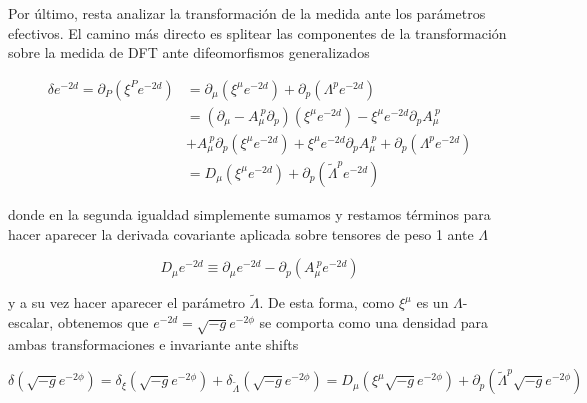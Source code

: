 \documentclass{article}
\numberwithin{equation}{section}
\begin{document}
\vspace{.5cm}

Por último, resta analizar la transformación de la medida ante los parámetros efectivos. El camino más directo es splitear las componentes de la transformación sobre la medida de DFT ante difeomorfismos generalizados

\begin{equation}
\begin{aligned}
\delta e^{-2 d} = \partial_P \left( \xi^P e^{-2 d}\right) &= \partial_{\mu} \left( \xi^{\mu} e^{-2 d}\right) + \partial_p \left( \Lambda^p e^{-2 d}\right)\\
&= \left(\partial_{\mu} - A_{\mu}^{\ p} \partial_p \right)\left( \xi^{\mu} e^{-2 d}\right) -\xi^{\mu} e^{-2 d} \partial_p A_{\mu}^{\ p}\\
&+ A_{\mu}^{\ p} \partial_p\left( \xi^{\mu} e^{-2 d}\right) + \xi^{\mu} e^{-2 d} \partial_p A_{\mu}^{\ p} + \partial_p \left( \Lambda^p e^{-2 d}\right)\\
&= D_{\mu}\left( \xi^{\mu} e^{-2 d}\right) + \partial_p \left( \widetilde{\Lambda}^p e^{-2 d}\right) 
\end{aligned}
\end{equation}

donde en la segunda igualdad simplemente sumamos y restamos términos para hacer aparecer la derivada covariante aplicada sobre tensores de peso 1 ante $ \Lambda $

\begin{equation}\label{Dcovdensidad}
D_{\mu} e^{-2d} \equiv \partial_{\mu}e^{-2d} - \partial_p \left( A_{\mu}^{\ p} e^{-2d} \right) 
\end{equation}

y a su vez hacer aparecer el parámetro $ \widetilde{\Lambda} $. De esta forma, como $ \xi^{\mu} $ es un $ \Lambda$-escalar, obtenemos que $ e^{-2d}=\sqrt{-g}e^{-2\phi} $ se comporta como una densidad para ambas transformaciones e invariante ante shifts

\begin{boxquation}
\begin{equation}\label{deltamedida}
\delta \left( \sqrt{-g} e^{-2\phi}\right) = \delta_{\xi} \left( \sqrt{-g} e^{-2\phi}\right) + \delta_{\widetilde{\Lambda}} \left( \sqrt{-g} e^{-2\phi}\right) = D_{\mu}\left( \xi^{\mu} \sqrt{-g} e^{-2 \phi}\right) + \partial_p \left( \widetilde{\Lambda}^p \sqrt{-g} e^{-2 \phi}\right) 
\end{equation}
\end{boxquation}
\end{document}
